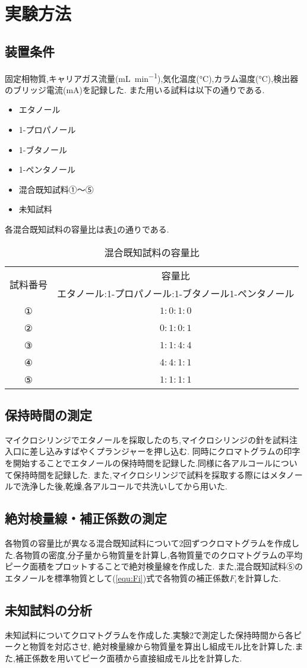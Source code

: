 \section{実験方法}
\subsection{装置条件}
固定相物質,キャリアガス流量(\si{\milli L.min^{-1}}),気化温度(\si{\degreeCelsius}),カラム温度(\si{\degreeCelsius}),検出器のブリッジ電流(\si{\milli\ampere})を記録した.
また用いる試料は以下の通りである.
\begin{itemize}
  \item エタノール
  \item 1-プロパノール
  \item 1-ブタノール
  \item 1-ペンタノール
  \item 混合既知試料①〜⑤
  \item 未知試料
\end{itemize}
各混合既知試料の容量比は表\ref{tab:kongo}の通りである.
\begin{table}[h]
   \caption{混合既知試料の容量比}
   \label{tab:kongo}
   \centering
   \begin{tabular}{cc}
     \hline
     \multirow{2}{*}{試料番号} & 容量比\\
     &エタノール:1-プロパノール:1-ブタノール1-ペンタノール\\
     \hline \hline
     ①&$1:0:1:0$\\
     ②&$0:1:0:1$\\
     ③&$1:1:4:4$\\
     ④&$4:4:1:1$\\
     ⑤&$1:1:1:1$\\
     \hline
   \end{tabular}
\end{table}
\subsection{保持時間の測定}
マイクロシリンジでエタノールを採取したのち,マイクロシリンジの針を試料注入口に差し込みすばやくプランジャーを押し込む.
同時にクロマトグラムの印字を開始することでエタノールの保持時間を記録した.同様に各アルコールについて保持時間を記録した.
また,マイクロシリンジで試料を採取する際にはメタノールで洗浄した後,乾燥,各アルコールで共洗いしてから用いた.
\subsection{絶対検量線・補正係数の測定}
各物質の容量比が異なる混合既知試料について2回ずつクロマトグラムを作成した.各物質の密度,分子量から物質量を計算し,各物質量でのクロマトグラムの平均ピーク面積をプロットすることで絶対検量線を作成した.
また,混合既知試料⑤のエタノールを標準物質として(\ref{equ:Fi})式で各物質の補正係数$F_i$を計算した.
\subsection{未知試料の分析}
未知試料についてクロマトグラムを作成した.実験2で測定した保持時間から各ピークと物質を対応させ,
絶対検量線から物質量を算出し組成モル比を計算した.また,補正係数を用いてピーク面積から直接組成モル比を計算した.


